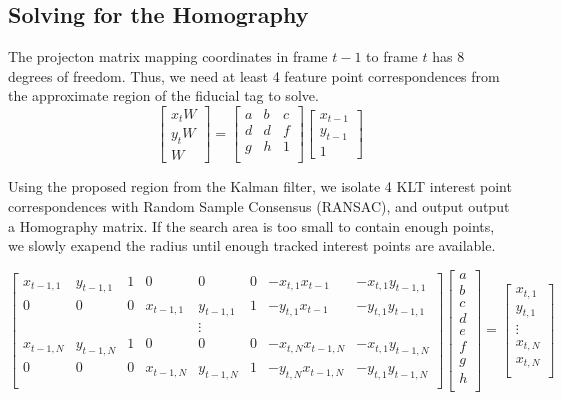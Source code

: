 \documentclass[12pt]{article}
\begin{document}
\subsection{Solving for the Homography}
The projecton matrix mapping coordinates in frame $t-1$ to frame $t$ has 8 degrees of freedom. Thus, we need at least 4 feature point correspondences from the approximate region of the fiducial tag to solve. 
\begin{equation}
\begin{bmatrix}
x_{t}W\\
y_{t}W\\
W
\end{bmatrix}
= \begin{bmatrix}
a&b&c\\
d&d&f\\
g&h&1\\
\end{bmatrix}
\begin{bmatrix}
x_{t-1}\\
y_{t-1}\\
1
\end{bmatrix}
\end{equation}

Using the proposed region from the Kalman filter, we isolate 4 KLT interest point correspondences  with Random Sample Consensus (RANSAC), and output output a Homography matrix. If the search area is too small to contain enough points, we slowly exapend the radius until enough tracked interest points are available.

\begin{equation}
\begin{bmatrix}
x_{t-1,1}& y_{t-1,1}&1&0&0&0 &-x_{t,1}x_{t-1}& -x_{t,1}y_{t-1,1}\\
0&0&0&x_{t-1,1}& y_{t-1,1}&1& -y_{t,1}x_{t-1} &-y_{t,1}y_{t-1,1}\\
&&&&\vdots&&\\
x_{t-1,N}& y_{t-1,N}&1&0&0&0& -x_{t,N}x_{t-1,N}& -x_{t,1}y_{t-1,N}\\
0&0&0&x_{t-1,N}& y_{t-1,N}&1& -y_{t,N}x_{t-1,N}& -y_{t,1}y_{t-1,N}\\
\end{bmatrix}
\begin{bmatrix}
a\\
b\\
c\\
d\\
e\\
f\\
g\\
h\\
\end{bmatrix} = 
\begin{bmatrix}
x_{t,1}\\
y_{t,1}\\
\vdots\\
x_{t,N}\\
x_{t,N}\\
\end{bmatrix}
\end{equation}
\end{document}
